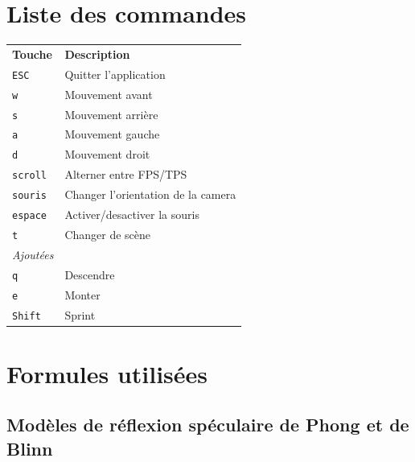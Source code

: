 \documentclass{article}[letterpaper, 11pt]
\begin{document}
\section{Liste des commandes}
\begin{tabular}{ll}
\textbf{Touche} & \textbf{Description} \\
\texttt{ESC} 		& Quitter l'application \\
\texttt{w} 			& Mouvement avant \\
\texttt{s} 			& Mouvement arrière \\
\texttt{a} 			& Mouvement gauche \\
\texttt{d} 			& Mouvement droit \\
\texttt{scroll} 	& Alterner entre FPS/TPS \\
\texttt{souris} 	& Changer l'orientation de la camera \\
\texttt{espace} 	& Activer/desactiver la souris \\
\texttt{t} 			& Changer de scène \\
\textit{Ajoutées} &\\
\texttt{q}			& Descendre \\
\texttt{e}			& Monter \\
\texttt{Shift}		& Sprint \\
\end{tabular}

\newpage
\section{Formules utilisées}\label{sec:formules}
\subsection{Modèles de réflexion spéculaire de Phong et de Blinn}
\end{document}

